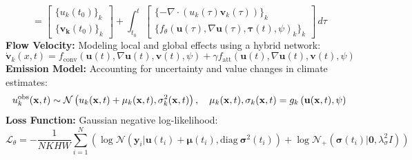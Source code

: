 \documentclass[landscape,a1paper,fontscale=0.424]{baposter}
\begin{document}
\begin{poster}
{\begin{equation*}
            = \begin{bmatrix} \{u_k(t_0)\}_k \\ \{ \mathbf{v_k}(t_0) \}_k \end{bmatrix} + \int_{t_0}^{t} \begin{bmatrix} \{  - \nabla \cdot \left( u_k(\tau)  \mathbf{v}_k(\tau) \right) \}_k \\ \{ f_{\theta}(\mathbf{u}(\tau), \nabla \mathbf{u}(\tau), \mathbf{\tau}(t), \psi)_k  \}_k \end{bmatrix} \,d\tau
        \end{equation*}
        \textbf{\color{blue}Flow Velocity:} Modeling local and global effects using a hybrid network:
        \vspace{-0.5em}
        \begin{equation*}
            \dot{\mathbf{v}}_k(x,t) = f_{\text{conv}} \left( \mathbf{u}(t), \nabla \mathbf{u}(t), \mathbf{v}(t), \psi \right) + \gamma f_{\text{att}} \left( \mathbf{u}(t), \nabla \mathbf{u}(t), \mathbf{v}(t), \psi \right) %
        \end{equation*}
        \textbf{\color{blue}Emission Model:} Accounting for uncertainty and value changes in climate estimates:
        \vspace{-0.5em}
        \begin{equation*}
            u_{k}^{\mathrm{obs}}({\bf x},t)\sim{\cal N}\left(u_{k}({\bf x},t)+\mu_{k}({\bf x},t),\sigma_{k}^{2}({\bf x},t)\right), \quad \mu_{k}({\bf x},t),\sigma_{k}({\bf x},t)=g_{k}\left({\bf u}({\bf x},t),\psi\right)
        \end{equation*}
        \vspace{-0.5em}
        \textbf{\color{blue}Loss Function:} Gaussian negative log-likelihood: %
        \vspace{-0.5em}
        \begin{equation*}
            \mathcal{L}_{\theta} = - \frac{1}{NKHW} \sum_{i=1}^{N} \left( \log \mathcal{N}\left(\mathbf{y}_{i}|\mathbf{u}(t_{i}) + \boldsymbol{\mu}(t_{i}), \text{diag}\ \boldsymbol{\sigma}^{2}(t_{i})\right) + \log \mathcal{N}_{+}\left(\boldsymbol{\sigma}(t_{i})|\boldsymbol{0},\lambda_{\sigma}^{2}I\right) \right)

\end{equation*}}
\end{poster}
\end{document}
